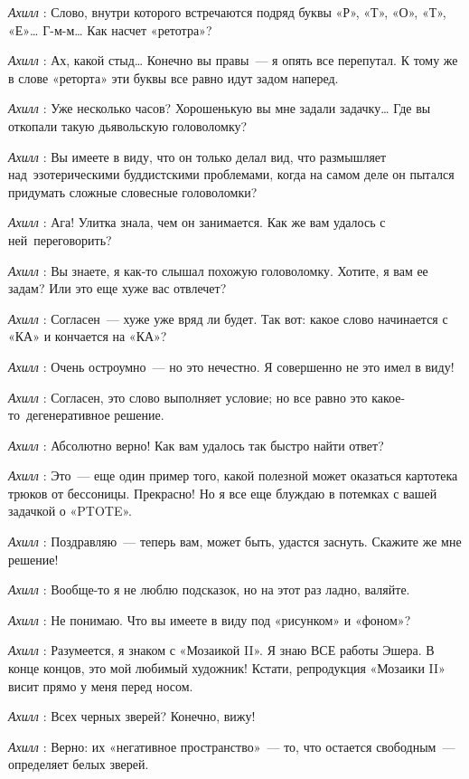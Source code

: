 \emph{Ахилл} : Слово, внутри которого встречаются подряд буквы «Р», «Т», «О», «Т», «Е»\ldots{} Г-м-м\ldots{} Как насчет «ретотра»?

\emph{Ахилл} : Ах, какой стыд\ldots{} Конечно вы правы~--- я опять все перепутал. К тому же в слове «реторта» эти буквы все равно идут задом наперед.

\emph{Ахилл} : Уже несколько часов? Хорошенькую вы мне задали задачку\ldots{} Где вы откопали такую дьявольскую головоломку?

\emph{Ахилл} : Вы имеете в виду, что он только делал вид, что размышляет над~эзотерическими буддистскими проблемами, когда на самом деле он пытался придумать сложные словесные головоломки?

\emph{Ахилл} : Ага! Улитка знала, чем он занимается. Как же вам удалось с ней~переговорить?

\emph{Ахилл} : Вы знаете, я как-то слышал похожую головоломку. Хотите, я вам ее задам? Или это еще хуже вас отвлечет?

\emph{Ахилл} : Согласен~--- хуже уже вряд ли будет. Так вот: какое слово начинается с «КА» и кончается на «КА»?

\emph{Ахилл} : Очень остроумно~--- но это нечестно. Я совершенно не это имел в виду!

\emph{Ахилл} : Согласен, это слово выполняет условие; но все равно это какое-то~дегенеративное решение.

\emph{Ахилл} : Абсолютно верно! Как вам удалось так быстро найти ответ?

\emph{Ахилл} : Это~--- еще один пример того, какой полезной может оказаться картотека трюков от бессоницы. Прекрасно! Но я все еще блуждаю в потемках с вашей задачкой о «PTOTE».

\emph{Ахилл} : Поздравляю~--- теперь вам, может быть, удастся заснуть. Скажите же мне решение!

\emph{Ахилл} : Вообще-то я не люблю подсказок, но на этот раз ладно, валяйте.

\emph{Ахилл} : Не понимаю. Что вы имеете в виду под «рисунком» и «фоном»?

\emph{Ахилл} : Разумеется, я знаком с «Мозаикой II». Я знаю ВСЕ работы Эшера. В конце концов, это мой любимый художник! Кстати, репродукция «Мозаики II» висит прямо у меня перед носом.

\emph{Ахилл} : Всех черных зверей? Конечно, вижу!

\emph{Ахилл} : Верно: их «негативное пространство»~--- то, что остается свободным~--- определяет белых зверей.

